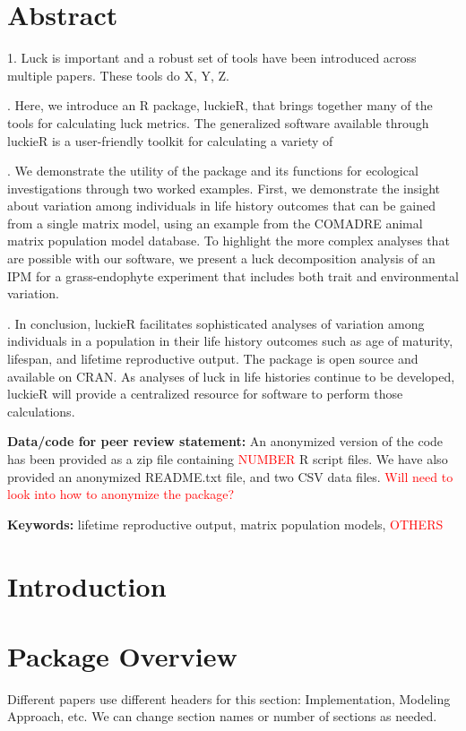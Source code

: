 \documentclass[11pt]{article}
\begin{document}
\doublespacing
\begin{linenumbers}

\section*{Abstract}
1. Luck is important and a robust set of tools have been introduced across multiple papers. These tools do X, Y, Z.

. Here, we introduce an R package, luckieR, that brings together many of the tools for calculating luck metrics. The generalized software available through luckieR is a user-friendly toolkit for calculating a variety of 

. We demonstrate the utility of the package and its functions for ecological investigations through two worked examples. First, we demonstrate the insight about variation among individuals in life history outcomes that can be gained from a single matrix model, using an example from the COMADRE animal matrix population model database. To highlight the more complex analyses that are possible with our software, we present a luck decomposition analysis of an IPM for a grass-endophyte experiment that includes both trait and environmental variation.

. In conclusion, luckieR facilitates sophisticated analyses of variation among individuals in a population in their life history outcomes such as age of maturity, lifespan, and lifetime reproductive output. The package is open source and available on CRAN. As analyses of luck in life histories continue to be developed, luckieR will provide a centralized resource for software to perform those calculations.

\noindent \textbf{Data/code for peer review statement:} An anonymized version of the code has been provided as a zip file containing \textcolor{red}{NUMBER} R script files. We have also provided an anonymized README.txt file, and two CSV data files. \textcolor{red}{Will need to look into how to anonymize the package?}

\noindent \textbf{Keywords:} lifetime reproductive output, matrix population models, \textcolor{red}{OTHERS}

\newpage
\section{Introduction}

\section{Package Overview}
Different papers use different headers for this section: Implementation, Modeling Approach, etc. We can change section names or number of sections as needed.


\end{linenumbers}
\end{document}
